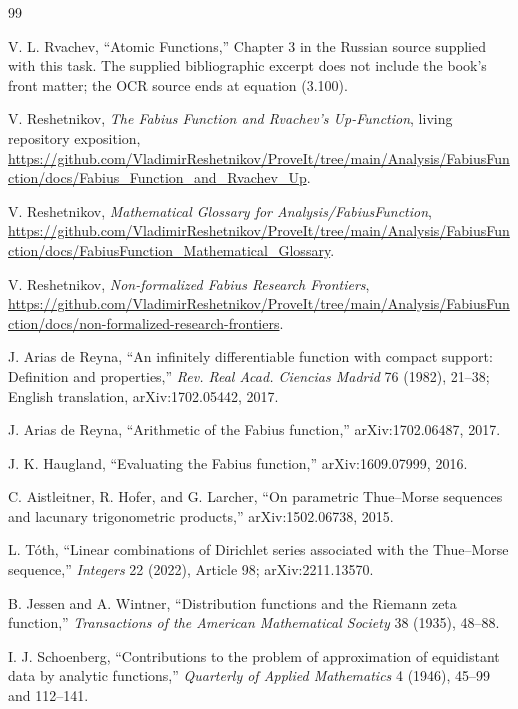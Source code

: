 \documentclass[11pt,oneside]{article}
\numberwithin{equation}{section}
\theoremstyle{definition}
\theoremstyle{remark}
\begin{document}
\begin{thebibliography}{99}

V. L. Rvachev, ``Atomic Functions,'' Chapter 3 in the Russian source supplied
with this task.  The supplied bibliographic excerpt does not include the book's
front matter; the OCR source ends at equation (3.100).

V. Reshetnikov,
\emph{The Fabius Function and Rvachev's Up-Function}, living repository
exposition,
\url{https://github.com/VladimirReshetnikov/ProveIt/tree/main/Analysis/FabiusFunction/docs/Fabius_Function_and_Rvachev_Up}.

V. Reshetnikov,
\emph{Mathematical Glossary for Analysis/FabiusFunction},
\url{https://github.com/VladimirReshetnikov/ProveIt/tree/main/Analysis/FabiusFunction/docs/FabiusFunction_Mathematical_Glossary}.

V. Reshetnikov,
\emph{Non-formalized Fabius Research Frontiers},
\url{https://github.com/VladimirReshetnikov/ProveIt/tree/main/Analysis/FabiusFunction/docs/non-formalized-research-frontiers}.

J. Arias de Reyna,
``An infinitely differentiable function with compact support: Definition and
properties,'' \emph{Rev. Real Acad. Ciencias Madrid} 76 (1982), 21--38;
English translation, arXiv:1702.05442, 2017.

J. Arias de Reyna,
``Arithmetic of the Fabius function,'' arXiv:1702.06487, 2017.

J. K. Haugland,
``Evaluating the Fabius function,'' arXiv:1609.07999, 2016.

C. Aistleitner, R. Hofer, and G. Larcher,
``On parametric Thue--Morse sequences and lacunary trigonometric products,''
arXiv:1502.06738, 2015.

L. T\'oth,
``Linear combinations of Dirichlet series associated with the Thue--Morse
sequence,'' \emph{Integers} 22 (2022), Article 98; arXiv:2211.13570.

B. Jessen and A. Wintner,
``Distribution functions and the Riemann zeta function,''
\emph{Transactions of the American Mathematical Society} 38 (1935), 48--88.

I. J. Schoenberg,
``Contributions to the problem of approximation of equidistant data by analytic
functions,'' \emph{Quarterly of Applied Mathematics} 4 (1946), 45--99 and
112--141.


\end{thebibliography}
\end{document}
